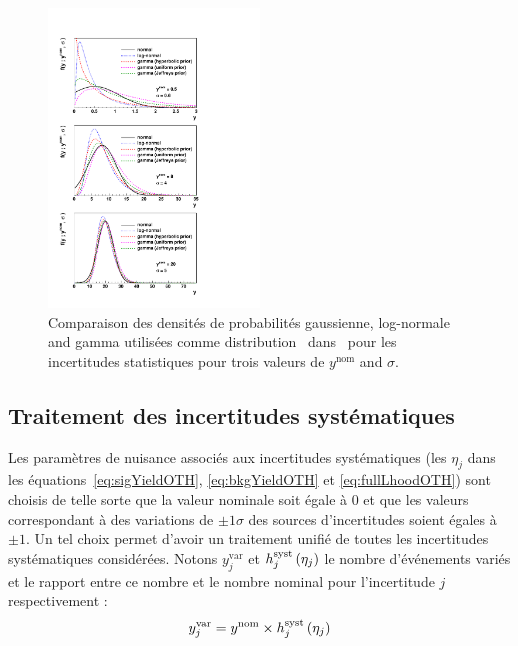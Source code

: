\begin{figure}[!htb]
\begin{center}
\hspace*{-0.5cm}
\includegraphics[width=0.5\textwidth]{figures/plotNormalLogNGamma.pdf}
\caption{Comparaison des densit\'es de probabilit\'es gaussienne, log-normale and gamma utilis\'ees comme distribution \prior~dans \opthylic~pour les incertitudes statistiques pour trois valeurs de $y^{\text{nom}}$ and $\sigma$.\label{fig:plotNormalLogNGamma}}
\end{center}
\end{figure}

\subsection{Traitement des incertitudes syst\'ematiques}
\label{sec:OTHTreatmentSystUncerts}

Les param\`etres de nuisance associ\'es aux incertitudes syst\'ematiques (les $\eta_j$ dans les \'equations~\ref{eq:sigYieldOTH}, \ref{eq:bkgYieldOTH} et \ref{eq:fullLhoodOTH}) sont choisis de telle sorte que la valeur nominale soit \'egale \`a 0 et que les valeurs correspondant \`a des variations de $\pm 1\sigma$ des sources d'incertitudes soient \'egales \`a $\pm 1$. 
Un tel choix permet d'avoir un traitement unifi\'e de toutes les incertitudes syst\'ematiques consid\'er\'ees. 
Notons $y^\text{var}_j$ et $\fsyst_j\left(\eta_j\right)$ le nombre d'\'ev\'enements vari\'es et le rapport entre ce nombre et le nombre nominal pour l'incertitude $j$ respectivement :
\begin{equation}
\label{eq:yvarVSynomANDsystevariation}
y^\text{var}_j=y^\text{nom}\times \fsyst_j\left(\eta_j\right)
\end{equation}

